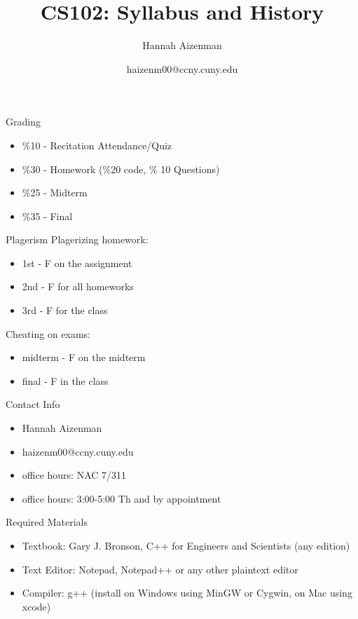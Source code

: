 \documentclass[xcolor={dvipsnames}]{beamer}
\begin{document}
\title{ CS102: Syllabus and History}
\author{Hannah Aizenman}
\date{haizenm00@ccny.cuny.edu}


\begin{frame}
	\titlepage
\end{frame}

\begin{frame}{Grading}
	\begin{itemize}
		\item \%10 - Recitation Attendance/Quiz
		\item \%30 - Homework (\%20 code, \% 10 Questions)
		\item \%25 - Midterm
 		\item \%35 - Final
	\end{itemize}
\end{frame}

\begin{frame}{Plagerism}
	Plagerizing homework:
	\begin{itemize}
		\item 1st - F on the assignment
		\item 2nd - F for all homeworks
		\item 3rd - F for the class
	\end{itemize}
	Cheating on exams:
	\begin{itemize}
		\item midterm - F on the midterm
		\item final - F in the class
	\end{itemize}
\end{frame}

\begin{frame}{Contact Info}
\begin{itemize}
	\item Hannah Aizenman
	\item haizenm00@ccny.cuny.edu
	\item office hours: NAC 7/311
	\item office hours: 3:00-5:00 Th and by appointment
\end{itemize}
\end{frame}

\begin{frame}{Required Materials}
\begin{itemize}
	\item Textbook: Gary J. Bronson, C++ for Engineers and Scientists (any edition)
	\item Text Editor: Notepad, Notepad++ or any other plaintext editor
	\item Compiler: g++ (install on Windows using MinGW or Cygwin, on Mac using xcode)
\end{itemize}
\end{frame}
\end{document}

